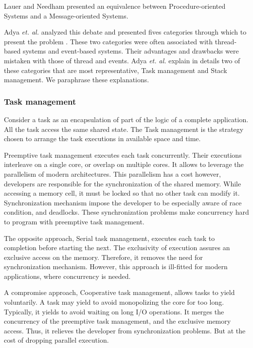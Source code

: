 Lauer and Needham \cite{Lauer1979} presented an equivalence between Procedure-oriented Systems and a Message-oriented Systems.



Adya \textit{et. al.} analyzed this debate and presented fives categories through which to present the problem \cite{Adya2002}.
These two categories were often associated with thread-based systems and event-based systems.
Their advantages and drawbacks were mistaken with those of thread and events.
Adya \textit{et. al.} explain in details two of these categories that are most representative, Task management and Stack management.
We paraphrase these explanations.

\subsubsection{Task management}

Consider a task as an encapsulation of part of the logic of a complete application.
All the task access the same shared state.
The Task management is the strategy chosen to arrange the task executions in available space and time.

Preemptive task management executes each task concurrently.
Their executions interleave on a single core, or overlap on multiple cores.
It allows to leverage the parallelism of modern architectures.
This parallelism has a cost however, developers are responsible for the synchronization of the shared memory.
While accessing a memory cell, it must be locked so that no other task can modify it.
Synchronization mechanism impose the developer to be especially aware of race condition, and deadlocks.
These synchronization problems make concurrency hard to program with preemptive task management.

The opposite approach, Serial task management, executes each task to completion before starting the next.
The exclusivity of execution assures an exclusive access on the memory.
Therefore, it removes the need for synchronization mechanism.
However, this approach is ill-fitted for modern applications, where concurrency is needed.

A compromise approach, Cooperative task management, allows tasks to yield voluntarily.
A task may yield to avoid monopolizing the core for too long.
Typically, it yields to avoid waiting on long I/O operations.
It merges the concurrency of the preemptive task management, and the exclusive memory access.
Thus, it relieves the developer from synchronization problems.
But at the cost of dropping parallel execution.

